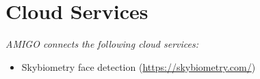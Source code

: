 \section*{Cloud Services}

\textit{AMIGO connects the following cloud services:}
\begin{itemize}
   \item Skybiometry face detection (\url{https://skybiometry.com/})
\end{itemize} 
